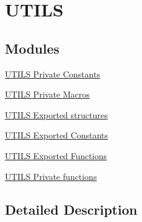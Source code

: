 \hypertarget{group___u_t_i_l_s___l_l}{}\section{U\+T\+I\+LS}
\label{group___u_t_i_l_s___l_l}
\subsection*{Modules}
\begin{DoxyCompactItemize}
\item 
\hyperlink{group___u_t_i_l_s___l_l___private___constants}{U\+T\+I\+L\+S Private Constants}
\item 
\hyperlink{group___u_t_i_l_s___l_l___private___macros}{U\+T\+I\+L\+S Private Macros}
\item 
\hyperlink{group___u_t_i_l_s___l_l___e_s___i_n_i_t}{U\+T\+I\+L\+S Exported structures}
\item 
\hyperlink{group___u_t_i_l_s___l_l___exported___constants}{U\+T\+I\+L\+S Exported Constants}
\item 
\hyperlink{group___u_t_i_l_s___l_l___exported___functions}{U\+T\+I\+L\+S Exported Functions}
\item 
\hyperlink{group___u_t_i_l_s___l_l___private___functions}{U\+T\+I\+L\+S Private functions}
\end{DoxyCompactItemize}


\subsection{Detailed Description}
